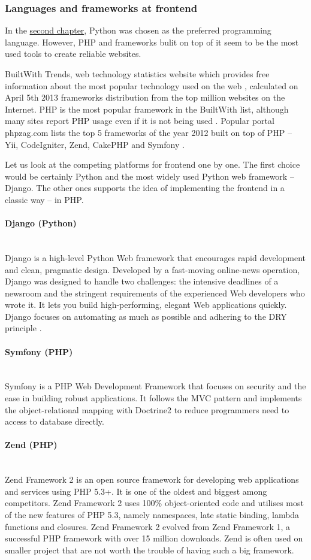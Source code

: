 \documentclass[thesis=B,english]{FITthesis}[2013/04/26]
\newcommand{\myparagraph}[1]{\paragraph{#1}\mbox{}\\}
\begin{document}
\subsubsection{Languages and frameworks at frontend}

In the \hyperref[TODO]{second chapter}, Python was chosen as the preferred programming language. However, PHP and frameworks bulit on top of it seem to be the most used tools to create reliable websites.

BuiltWith Trends, web technology statistics website which provides free information about the most popular technology used on the web \cite{builtwithfaq}, calculated on April 5th 2013 frameworks distribution from the top million websites on the Internet. PHP is the most popular framework in the BuiltWith list, although many sites report PHP usage even if it is not being used \cite{builtwithfaq}. Popular portal phpzag.com \cite{mysitecostphpzag} lists the top 5 frameworks of the year 2012 built on top of PHP -- Yii, CodeIgniter, Zend, CakePHP and Symfony \cite{phpzag}.

Let us look at the competing platforms for frontend one by one. The first choice would be certainly Python and the most widely used Python web framework -- Django. The other ones supports the idea of implementing the frontend in a classic way -- in PHP. 

\myparagraph{Django (Python)}

Django is a high-level Python Web framework that encourages rapid development and clean, pragmatic design. Developed by a fast-moving online-news operation, Django was designed to handle two challenges: the intensive deadlines of a newsroom and the stringent requirements of the experienced Web developers who wrote it. It lets you build high-performing, elegant Web applications quickly. Django focuses on automating as much as possible and adhering to the DRY principle \cite{django}.

\myparagraph{Symfony (PHP)}

Symfony is a PHP Web Development Framework that focuses on security and the ease in building robust applications. It follows the MVC pattern and implements the object-relational mapping with Doctrine2 to reduce programmers need to access to database directly. 

\myparagraph{Zend (PHP)}

Zend Framework 2 is an open source framework for developing web applications and services using PHP 5.3+. It is one of the oldest and biggest among competitors. Zend Framework 2 uses 100\% object-oriented code and utilises most of the new features of PHP 5.3, namely namespaces, late static binding, lambda functions and closures. Zend Framework 2 evolved from Zend Framework 1, a successful PHP framework with over 15 million downloads. \cite{zend} Zend is often used on smaller project that are not worth the trouble of having such a big framework. \\
\end{document}

